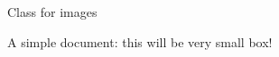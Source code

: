 \documentclass{standalone}
\begin{document}
Class for images

A simple document: this will be very small box!
\end{document}
